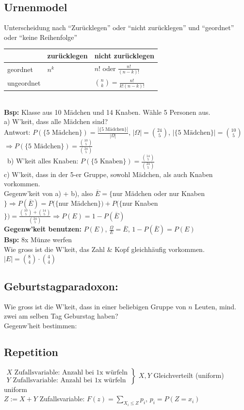 \documentclass[a4paper,10pt]{article}
\newcommand{\Bold}[1]{\textbf{#1}} %
\newcommand{\T}[1]{\text{#1}} %
\newcommand{\Ra}{\Rightarrow}
\newcommand{\Abs}[1]{\left| #1 \right|} %
\newcommand{\Brackar}[2]{\left.\begin{array}{#1} #2 \end{array}\right\rbrace} %
\newcommand{\Sum}[2]{\sum_{#2}^{#1}} %
\begin{document}
\subsection{Urnenmodel}
Unterscheidung nach "`Zurücklegen"' oder "`nicht zurücklegen"' und "`geordnet"' oder "`keine Reihenfolge"'
\begin{tabular}{l|l|l}
 &zurücklegen&nicht zurücklegen\\\hline
 geordnet&$n^k$&$n!$ oder $\frac{n!}{(n-k)!}$\\\hline
 ungeordnet&&$\binom{n}{k}=\frac{n!}{k!(n-k)!}$
\end{tabular}\\
\Bold{Bsp:} Klasse aus 10 Mädchen und 14 Knaben. Wähle 5 Personen aus.\\
a) W'keit, dass alle Mädchen sind?\\
Antwort: $P(\{5\T{ Mädchen}\})=\frac{\Abs{\{5\T{ Mädchen}\}}}{\Abs{\Omega}}$, $\Abs{\Omega}={24 \choose 5}$, $\Abs{\{5\T{ Mädchen}\}}={10\choose5}$\\
$\Ra P(\{5\T{ Mädchen}\})=\frac{{10\choose5}}{{24\choose5}}$\\\
b) W'keit alles Knaben: $P(\{5\T{ Knaben}\})=\frac{{14\choose5}}{{24\choose5}}$\\
c) W'keit, dass in der 5-er Gruppe, sowohl Mädchen, als auch Knaben vorkommen.\\
Gegenw'keit von a) + b), also $\overline{E}=\{$nur Mädchen oder nur Knaben$\}\Ra P(\overline{E})=P(\{$nur Mädchen$\})+P(\{$nur Knaben$\})=\frac{{10\choose5}+{14\choose5}}{{24\choose5}}\Ra P(E)=1-P(\overline{E})$\\
\Bold{Gegenw'keit benutzen:} $P(E)$, $\frac{\Omega}{E}=\overline{E}$, $1-P(\overline{E})=P(E)$\\
\Bold{Bsp:} 8x Münze werfen\\
Wie gross ist die W'keit, das Zahl \& Kopf gleichhäufig vorkommen.\\
$\Abs{E}={8\choose4}\cdot{4\choose4}$
\subsection{Geburtstagparadoxon:}
Wie gross ist die W'keit, dass in einer beliebigen Gruppe von $n$ Leuten, mind. zwei am selben Tag Geburstag haben?\\
Gegenw'heit bestimmen: \\
\subsection{Repetition}
$\Brackar{l}{
X\T{ Zufallsvariable: Anzahl bei 1x würfeln}\\
Y\T{ Zufallsvariable: Anzahl bei 1x würfeln}}$
$X,Y$ Gleichverteilt (uniform) uniform\\
$Z:=X+Y$ Zufallsvariable: $F(z)=\Sum{}{X_i\leq Z}p_i$, $p_i =P(Z=x_i)$\\
\end{document}
